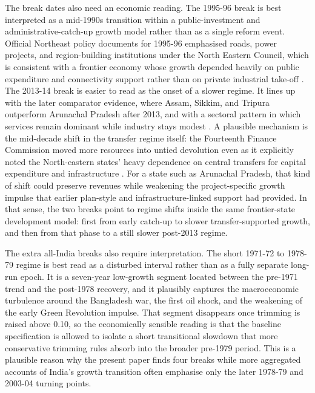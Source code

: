 \documentclass[11pt,a4paper]{article}
\begin{document}
The break dates also need an economic reading. The 1995-96 break is best interpreted as a mid-1990s transition within a public-investment and administrative-catch-up growth model rather than as a single reform event. Official Northeast policy documents for 1995-96 emphasised roads, power projects, and region-building institutions under the North Eastern Council, which is consistent with a frontier economy whose growth depended heavily on public expenditure and connectivity support rather than on private industrial take-off \citep{mha_1996_annual_report,cashin_sahay_1995}. The 2013-14 break is easier to read as the onset of a slower regime. It lines up with the later comparator evidence, where Assam, Sikkim, and Tripura outperform Arunachal Pradesh after 2013, and with a sectoral pattern in which services remain dominant while industry stays modest \citep{niti_ncaer_2025_arunachal}. A plausible mechanism is the mid-decade shift in the transfer regime itself: the Fourteenth Finance Commission moved more resources into untied devolution even as it explicitly noted the North-eastern states' heavy dependence on central transfers for capital expenditure and infrastructure \citep{fourteenth_finance_commission_2015}. For a state such as Arunachal Pradesh, that kind of shift could preserve revenues while weakening the project-specific growth impulse that earlier plan-style and infrastructure-linked support had provided. In that sense, the two breaks point to regime shifts inside the same frontier-state development model: first from early catch-up to slower transfer-supported growth, and then from that phase to a still slower post-2013 regime.

The extra all-India breaks also require interpretation. The short 1971-72 to 1978-79 regime is best read as a disturbed interval rather than as a fully separate long-run epoch. It is a seven-year low-growth segment located between the pre-1971 trend and the post-1978 recovery, and it plausibly captures the macroeconomic turbulence around the Bangladesh war, the first oil shock, and the weakening of the early Green Revolution impulse. That segment disappears once trimming is raised above 0.10, so the economically sensible reading is that the baseline specification is allowed to isolate a short transitional slowdown that more conservative trimming rules absorb into the broader pre-1979 period. This is a plausible reason why the present paper finds four breaks while more aggregated accounts of India's growth transition often emphasise only the later 1978-79 and 2003-04 turning points.
\end{document}
